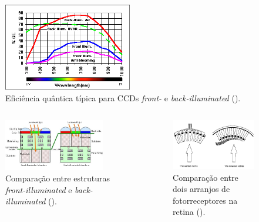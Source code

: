 \begin{frame}[allowframebreaks]
  \framebreak

  \begin{figure}[h!]
  \centering
  \includegraphics[width=0.5\textwidth]{images/quantum-eff.png}
  \caption{Eficiência quântica típica para CCDs \textit{front-} e \textit{back-illuminated} ().}
  \label{fig:quantum}
  \end{figure}

  \framebreak

  \begin{columns}[c]
    \begin{figure}[h!]
    \centering
    \includegraphics[width=0.9\textwidth]{images/front-back.jpg}
    \caption{Comparação entre estruturas \textit{front-illuminated} e \textit{back-illuminated} ().}
    \label{fig:front-back}
    \end{figure}
    \begin{figure}[h!]
    \centering
    \includegraphics[width=\textwidth]{images/invretina.png}
    \caption{Comparação entre dois arranjos de fotorreceptores na retina ().}
    \label{fig:invretina}
    \end{figure} 
  \end{columns}


\end{frame}
